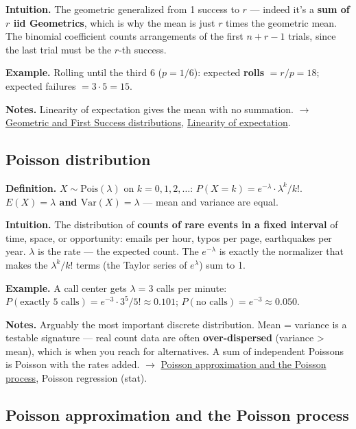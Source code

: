 \documentclass[11pt,a4paper]{article}
\begin{document}
\textbf{Intuition.} The geometric generalized from 1 success to $r$ --- indeed it's a \textbf{sum of $r$ iid Geometrics}, which is why the mean is just $r$ times the geometric mean. The binomial coefficient counts arrangements of the first $n + r - 1$ trials, since the last trial must be the $r$-th success.

\textbf{Example.} Rolling until the third 6 ($p = 1/6$): expected \textbf{rolls} $= r/p = 18$; expected failures $= 3\cdot 5 = 15$.

\textbf{Notes.} Linearity of expectation gives the mean with no summation. $\to$ \hyperref[sec:geometric-and-first-success-distributions]{Geometric and First Success distributions}, \hyperref[sec:linearity-of-expectation]{Linearity of expectation}.

\subsection{Poisson distribution}\label{sec:poisson-distribution}

\textbf{Definition.} $X \sim \mathrm{Pois}(\lambda )$ on $k = 0, 1, 2, \ldots$:
$P(X = k) = e^{-\lambda }\cdot \lambda ^{k} / k!$. \textbf{$E(X) = \lambda$ and $\mathrm{Var}(X) = \lambda$} --- mean and variance are equal.

\textbf{Intuition.} The distribution of \textbf{counts of rare events in a fixed interval} of time, space, or opportunity: emails per hour, typos per page, earthquakes per year. $\lambda$ is the rate --- the expected count. The $e^{-\lambda }$ is exactly the normalizer that makes the $\lambda ^{k}/k!$ terms (the Taylor series of $e^\lambda$) sum to 1.

\textbf{Example.} A call center gets $\lambda  = 3$ calls per minute: $P(\text{exactly 5 calls}) = e^{-3}\cdot 3^{5}/5! \approx  0.101$; $P(\text{no calls}) = e^{-3} \approx  0.050$.

\textbf{Notes.} Arguably the most important discrete distribution. Mean = variance is a testable signature --- real count data are often \textbf{over-dispersed} (variance > mean), which is when you reach for alternatives. A sum of independent Poissons is Poisson with the rates added. $\to$ \hyperref[sec:poisson-approximation-and-the-poisson-process]{Poisson approximation and the Poisson process}, Poisson regression (stat).

\subsection{Poisson approximation and the Poisson process}\label{sec:poisson-approximation-and-the-poisson-process}
\end{document}
